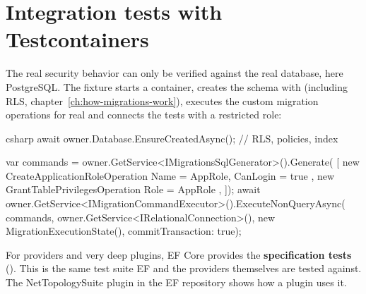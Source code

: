 \section{Integration tests with Testcontainers}

The real security behavior can only be verified against the real database, here PostgreSQL. The fixture starts a
container, creates the schema with  (including RLS,
chapter~\ref{ch:how-migrations-work}), executes the custom migration operations for real and
connects the tests with a restricted role:

\begin{sourcecode}{csharp}
await owner.Database.EnsureCreatedAsync();          // RLS, policies, index

var commands = owner.GetService<IMigrationsSqlGenerator>().Generate(
[
    new CreateApplicationRoleOperation { Name = AppRole, CanLogin = true },
    new GrantTablePrivilegesOperation { Role = AppRole },
]);
await owner.GetService<IMigrationCommandExecutor>().ExecuteNonQueryAsync(
    commands, owner.GetService<IRelationalConnection>(),
    new MigrationExecutionState(), commitTransaction: true);
\end{sourcecode}


\begin{tip}
  For providers and very deep plugins, EF Core provides the \textbf{specification tests}
  ().
  This is the same test suite EF and the providers themselves are tested against. The
  NetTopologySuite plugin in the EF repository shows how a plugin uses it.
\end{tip}

